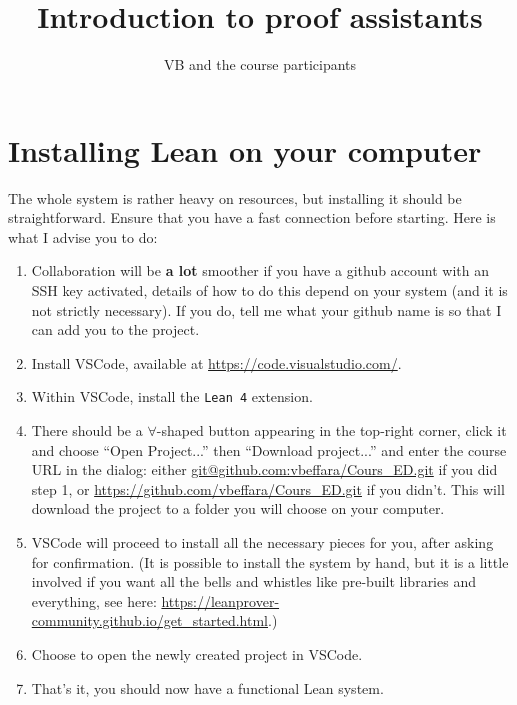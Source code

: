 \documentclass{report}
\title{Introduction to proof assistants}
\author{VB and the course participants}
\begin{document}
\maketitle

\section*{Installing Lean on your computer}

The whole system is rather heavy on resources, but installing it should be
straightforward. Ensure that you have a fast connection before starting. Here is
what I advise you to do:
\begin{enumerate}
  \item Collaboration will be \textbf{a lot} smoother if you have a github
    account with an SSH key activated, details of how to do this depend on your
    system (and it is not strictly necessary). If you do, tell me what your
    github name is so that I can add you to the project.
  \item Install VSCode, available at \url{https://code.visualstudio.com/}.
  \item Within VSCode, install the \texttt{Lean 4} extension.
  \item There should be a $\forall$-shaped button appearing in the top-right
    corner, click it and choose ``Open Project...'' then ``Download project...''
    and enter the course URL in the dialog: either
    \url{git@github.com:vbeffara/Cours_ED.git} if you did step 1, or
    \url{https://github.com/vbeffara/Cours_ED.git} if you didn't. This will
    download the project to a folder you will choose on your computer.
  \item VSCode will proceed to install all the necessary pieces for you, after
    asking for confirmation. (It is possible to install the system by hand, but
    it is a little involved if you want all the bells and whistles like
    pre-built libraries and everything, see here:
    \url{https://leanprover-community.github.io/get_started.html}.)
  \item Choose to open the newly created project in VSCode.
  \item That's it, you should now have a functional Lean system.
\end{enumerate}


\end{document}
